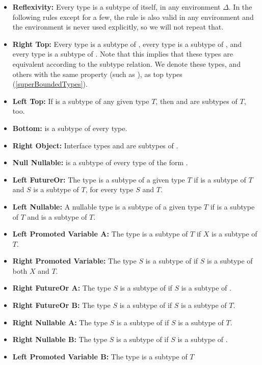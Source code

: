 \documentclass[makeidx]{article}
\begin{document}
{{  \def\Item#1#2{\item[#1]{\textbf{#2:}}}
  \begin{itemize}
  \Item{\SrnReflexivity}{Reflexivity}
    Every type is a subtype of itself, in any environment $\Delta$.
    In the following rules except for a few,
    the rule is also valid in any environment
    and the environment is never used explicitly,
    so we will not repeat that.
  \Item{\SrnRightTop}{Right Top}
    Every type is a subtype of ,
    every type is a subtype of \DYNAMIC,
    and every type is a subtype of \VOID.
    Note that this implies that these types are equivalent
    according to the subtype relation.
    We denote these types,
    and others with the same property (such as ),
    as top types
    (\ref{superBoundedTypes}).
  \Item{\SrnLeftTop}{Left Top}
    If  is a subtype of any given type $T$,
    then \DYNAMIC{} and \VOID{} are subtypes of $T$, too.
  \Item{\SrnBottom}{Bottom}
     is a subtype of every type.
  \Item{\SrnRightObjectFour}{Right Object}
    Interface types and \FUNCTION{} are subtypes of .
  \Item{\SrnNullOne}{Null Nullable}
     is a subtype of every type of the form .
  \Item{\SrnLeftFutureOr}{Left FutureOr}
    The type  is a subtype of a given type $T$
    if  is a subtype of $T$ and $S$ is a subtype of $T$,
    for every type $S$ and $T$.
  \Item{\SrnLeftNullable}{Left Nullable}
    A nullable type  is a subtype of a given type $T$
    if  is a subtype of $T$ and  is a subtype of $T$.
  \Item{\SrnLeftPromotedVariableOne}{Left Promoted Variable A}
    The type  is a subtype of $T$
    if $X$ is a subtype of $T$.
  \Item{\SrnRightPromotedVariable}{Right Promoted Variable}
    The type $S$ is a subtype of 
    if $S$ is a subtype of both $X$ and $T$.
  \Item{\SrnRightFutureOrA}{Right FutureOr A}
    The type $S$ is a subtype of 
    if $S$ is a subtype of .
  \Item{\SrnRightFutureOrB}{Right FutureOr B}
    The type $S$ is a subtype of 
    if $S$ is a subtype of $T$.
  \Item{\SrnRightNullableOne}{Right Nullable A}
    The type $S$ is a subtype of 
    if $S$ is a subtype of $T$.
  \Item{\SrnRightNullableTwo}{Right Nullable B}
    The type $S$ is a subtype of 
    if $S$ is a subtype of .
  \Item{\SrnLeftPromotedVariableTwo}{Left Promoted Variable B}
    The type  is a subtype of $T$

\end{itemize}}}
\end{document}
